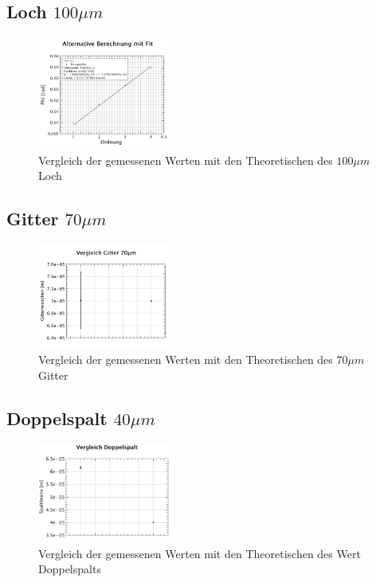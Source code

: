 \subsection*{Loch $100\mu m$}
\begin{figure}[h!]
	\centering
	\includegraphics[width=0.4\textwidth]{data/fit_felerhaftes_loch.png}
	\caption{Vergleich der gemessenen Werten mit den Theoretischen des $100\mu m$ Loch}
	\label{fig:dis_loch_100}
\end{figure}

\subsection*{Gitter $70\mu m$}
\begin{figure}[h!]
	\centering
	\includegraphics[width=0.4\textwidth]{data/dis_gitter.png}
	\caption{Vergleich der gemessenen Werten mit den Theoretischen des $70\mu m$ Gitter}
	\label{fig:dis_gitter}
\end{figure}

\subsection*{Doppelspalt $40\mu m$}
\begin{figure}[h!]
	\centering
	\includegraphics[width=0.4\textwidth]{data/dis_doppel.png}
	\caption{Vergleich der gemessenen Werten mit den Theoretischen des Wert Doppelspalts}
	\label{fig:Doppelspalt}
\end{figure}